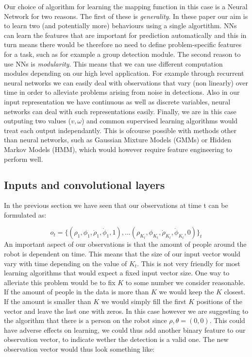\documentclass[letterpaper, 10 pt, conference]{ieeeconf}
\begin{document}
Our choice of algorithm for learning the mapping function in this case is a Neural Network for two reasons. The first of these is \emph{generality}. In these paper our aim is to learn two (and potentially more) behaviours using a single algortithm. NNs can learn the features that are important for prediction automatically and this in turn means there would be therefore no need to define problem-specific features for a task, such as for example a group detection module. The second reason to use NNs is \emph{modularity}. This means that we can use different computation modules depending on our high level application. For example through recurrent neural networks we can easily deal with observations that vary (non linearly) over time in order to alleviate problems arising from noise in detections. Also in our input representation we have continuous as well as discrete variables, neural networks can deal with such representations easily. Finally, we are in this case outputing two values ($v,\omega$) and common supervised learning algorithms would treat each output independantly. This is ofcourse possible with methods other than neural networks, such as Gaussian Mixture Models (GMMs) or Hidden Markov Models (HMM), which would however require feature engineering to perform well.  

\subsection{Inputs and convolutional layers \label{subsec:meth_inp}}
In the previous section we have seen that our observations at time t can be formulated as:

\begin{equation}
 	o_t = \{(\rho_1,\phi_1,\dot{\rho}_1,\dot{\phi}_1,1),... (\rho_{K_t},\phi_{K_t},\dot{\rho}_{K_t},\dot{\phi}_{K_t},0)\}_t
\end{equation}
An important aspect of our observations is that the amount of people around the robot is dependent on time. This means that the size of our input vector would vary with time depending on the value of $K_t$. This is not very friendly for most learning algorithms that would expect a fixed input vector size. One way to alleviate this problem would be to fix $K$ to some number we consider reasonable. If the amount of people in the data is more than $K$ we would keep the $K$ closest. If the amount is smaller than $K$ we would simply fill the first $K$ positions of the vector and leave the last one with zeros. In this case however we are suggesting to the algorithm that there is a person on the robot since $\rho,\theta = (0,0)$. This could have adverse effects on learning, we could thus add another binary feature to our observation vector, to indicate wether the detection is a valid one. The new observation vector would thus look something like:
\end{document}
